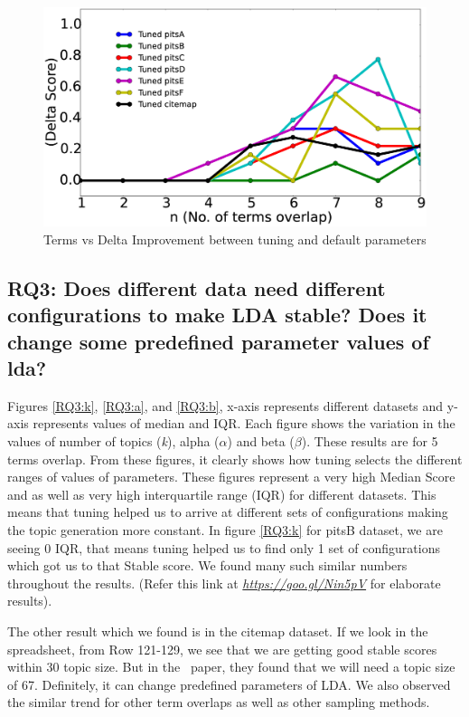 \documentclass[10pt,conference]{IEEEtran}
\theoremstyle{break}
\begin{document}
\begin{center}
\begin{figure}[!htbp]
  \includegraphics[width=\linewidth]{./fig/tuned_delta_vem.eps}
  \caption{Terms vs Delta Improvement between tuning and default parameters}
  \label{fig:delta}
\end{figure}
\vspace{-0.5cm}
\end{center}

\subsection{\textbf{RQ3: Does different data need different configurations to make LDA stable? Does it change some predefined parameter values of lda?}}

Figures \ref{RQ3:k}, \ref{RQ3:a}, and \ref{RQ3:b}, x-axis represents different datasets and y-axis represents values of median and IQR. Each figure shows the variation in the values of number of topics (\textit{k}), alpha ($\alpha$) and beta ($\beta$). These results are for 5 terms overlap. From these figures, it clearly shows how tuning selects the different ranges of values of parameters. These figures represent a very high Median Score and as well as very high interquartile range (IQR) for different datasets. This means that tuning helped us to arrive at different sets of configurations making the topic generation more constant. In figure \ref{RQ3:k} for pitsB dataset, we are seeing 0 IQR, that means tuning helped us to find only 1 set of configurations which got us to that Stable score. We found many such similar numbers throughout the results. (Refer this link at \href{https://goo.gl/Nin5pV}{\textit{https://goo.gl/Nin5pV}} for elaborate results).

The other result which we found is in the citemap dataset. If we look in the spreadsheet, from Row 121-129, we see that we are getting good stable scores within 30 topic size. But in the~\cite{garousi2016citations} paper, they found that we will need a topic size of 67. Definitely, it can change predefined parameters of LDA.
We also observed the similar trend for other term overlaps as well as other sampling methods.
\end{document}

